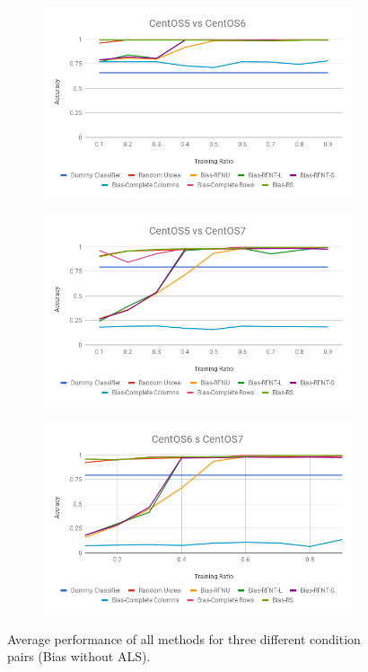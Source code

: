 \documentclass[10pt, conference, compsocconf]{IEEEtran}
\begin{document}
\begin{figure}[h!]
        \centering
        \begin{subfigure}[b]{0.8\linewidth}
                \includegraphics[width=\columnwidth]{figures/Bias/Bias-5vs6-PFS}
        \end{subfigure}	
        \begin{subfigure}[b]{0.8\linewidth}
                \includegraphics[width=\columnwidth]{figures/Bias/Bias-5vs7-PFS}
        \end{subfigure}
        \begin{subfigure}[b]{0.8\linewidth}
                \includegraphics[width=\columnwidth]{figures/Bias/Bias-6vs7-PFS}
        \end{subfigure}
        \caption{Average performance of all methods for three different condition pairs (Bias without ALS).}
        \label{fig:Bias-PFS}
\end{figure}
\end{document}
